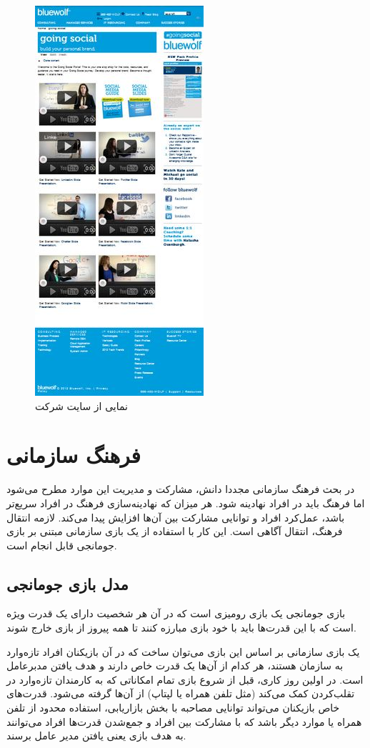 \begin{figure}[!htb]
	\centering
	\includegraphics[height=0.5\textheight]{Figures/bluewolf.png}
	\caption{نمایی از سایت شرکت }
\end{figure}

\section{فرهنگ سازمانی}
در بحث فرهنگ سازمانی مجددا دانش، مشارکت و مدیریت این موارد مطرح می‌شود اما فرهنگ باید در افراد نهادینه شود. هر میزان که نهادینه‌سازی فرهنگ در افراد سریع‌تر باشد، عمل‌کرد افراد و توانایی مشارکت بین آن‌ها افزایش پیدا می‌کند. لازمه انتقال فرهنگ، انتقال آگاهی است. این کار با استفاده از یک بازی سازمانی مبتنی بر بازی جومانجی قابل انجام است.
\subsection{مدل بازی جومانجی}
بازی جومانجی یک بازی رومیزی است که در آن هر شخصیت دارای یک قدرت ویژه است  که با این قدرت‌ها باید با خود بازی مبارزه کنند تا همه پیروز از بازی خارج شوند.

یک بازی سازمانی بر اساس این بازی می‌توان ساخت که در آن بازیکنان افراد تازه‌وارد به سازمان هستند، هر کدام از آن‌ها یک قدرت خاص دارند و هدف یافتن مدبرعامل است. در اولین روز کاری، قبل از شروع بازی تمام امکاناتی که به کارمندان تازه‌وارد در تقلب‌کردن کمک می‌کند (مثل تلفن همراه یا لپتاپ) از آن‌ها گرفته می‌شود. قدرت‌های خاص بازیکنان می‌تواند توانایی مصاحبه با بخش بازاریابی، استفاده محدود از تلفن همراه یا موارد دیگر باشد که با مشارکت بین افراد و جمع‌شدن قدرت‌ها افراد می‌توانند به هدف بازی یعنی یافتن مدیر عامل برسند.

